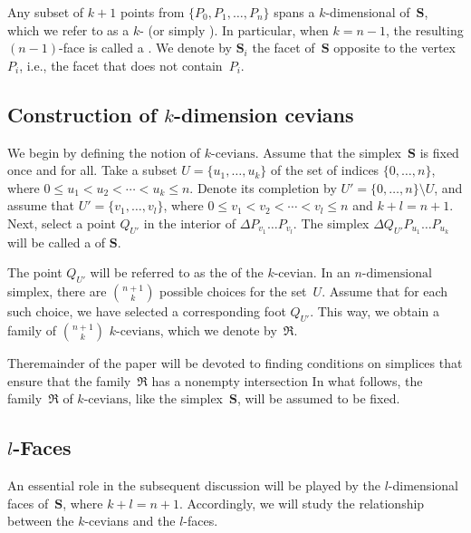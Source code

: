 \documentclass[12pt, reqno]{amsart}
\theoremstyle{definition}
\theoremstyle{remark}
\numberwithin{equation}{section}
\begin{document}
{Any subset of $k+1$ points from $\{P_0,P_1,\dots,P_n\}$ spans a $k$-dimensional  of~$\mathbf{S}$, which we refer to as a $k$- (or simply ). In particular, when $k = n - 1$, the resulting $(n-1)$-face is called a . We denote by $\mathbf{S}_i$ the facet of~$\mathbf{S}$ opposite to the vertex~$P_i$, i.e., the facet that does not contain~$P_i$. %

\subsection{Construction of $k$-dimension cevians}\label{construction}
We begin by defining the notion of $k\mbox{-cevians}$. Assume that the simplex~$\mathbf{S}$ is fixed once and for all. Take a subset $U = \{u_1,\dotsc ,u_k\}$ of the set of indices $\{0,\dotsc ,n\}$, where $0\leq u_1<u_2<\dotsb <u_k\leq n$. Denote its completion by $U' = \{0,\dotsc ,n\}\setminus U$, and assume that $U'=\{v_1,\dotsc ,v_l\}$, where $0\leq v_1<v_2<\dotsb <v_{l}\leq n$ and $k+l=n+1$. Next, select a point $Q_{U'}$ in the interior of $\Delta P_{v_1}\dotsc P_{v_l}$. The simplex $\Delta Q_{U'}P_{u_1}\dotsc P_{u_k}$ will be called a  of $\mathbf{S}$. 

The point $Q_{U'}$ will be referred to as the  of the $k$-cevian. In an $n\mbox{-dimensional}$ simplex, there are ${n+1 \choose k}$ possible choices for the set~$U$. Assume that for each such choice, we have selected a corresponding foot $Q_{U'}$. This way, we obtain a family of ${n+1 \choose k}$ $k\mbox{-cevians}$, which we denote by~$\mathfrak{R}$. 

Theremainder of the paper will be devoted to finding conditions on simplices that ensure that the family~$\mathfrak{R}$ has a nonempty intersection In what follows, the family~$\mathfrak{R}$ of $k\mbox{-cevians}$, like the simplex~$\mathbf{S}$, will be assumed to be fixed.


\subsection{\texorpdfstring{$l$-Faces}{l-Faces}}
An essential role in the subsequent discussion will be played by the $l$-dimensional faces of~$\mathbf{S}$, where $k + l = n + 1$. Accordingly, we will study the relationship between the $k$-cevians and the $l$-faces.

}
\end{document}
